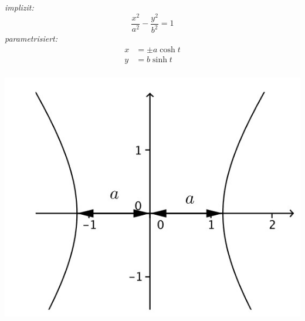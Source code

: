 \vspace{3pt}
\begin{minipage}{0.5\linewidth}
        \vspace{0.5em}
        \textit{implizit:}
        $$
            \frac{x^2}{a^2}  - \frac{y^2}{b^2} = 1
        $$
        \textit{parametrisiert:}
        \begin{align*}
            x &= \pm a \cosh{t}\\
            y &= b \sinh{t}\\
        \end{align*}
\end{minipage}
\begin{minipage}{0.49\linewidth}
        \includegraphics[width=0.8\linewidth]{src/Appendix/Hyperbel.jpg}
\end{minipage}

